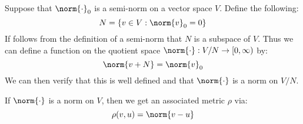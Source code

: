 \documentclass[crop=false,class=article,oneside]{standalone}
\begin{document}
            \begin{lexample}
                Suppose that $\norm{\cdot}_{0}$ is a semi-norm on a vector
                space $V$. Define the following:
                \begin{equation}
                    N=\{v\in{V}:\norm{v}_{0}=0\}
                \end{equation}
                If follows from the definition of a semi-norm that
                $N$ is a subspace of $V$. Thus we can define a function on
                the quotient space $\norm{\cdot}:V/N\rightarrow[0,\infty)$ by:
                \begin{equation}
                    \norm{v+N}=\norm{v}_{0}
                \end{equation}
                We can then verify that this is well defined and that
                $\norm{\cdot}$ is a norm on $V/N$.
            \end{lexample}
            If $\norm{\cdot}$ is a norm on $V$, then we get an associated
            metric $\rho$ via:
            \begin{equation}
                \rho(v,u)=\norm{v-u}
            \end{equation}
\end{document}
